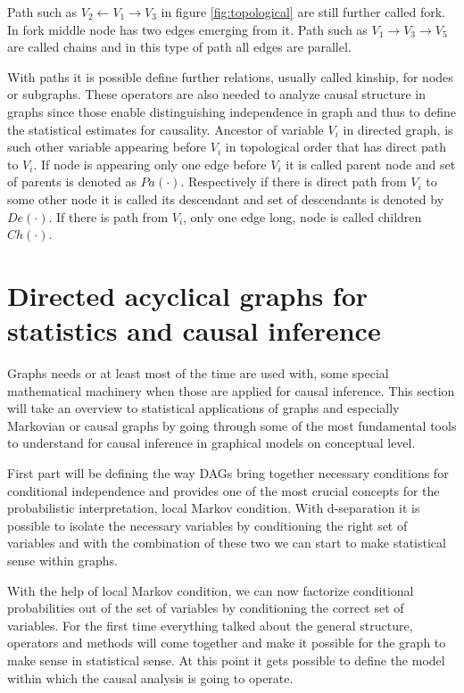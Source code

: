 \documentclass[main=english,12pt,a4paper,pdftex,econ,utf8]{aaltothesis}
\newcommand{\ch}[1]{Ch(#1)}
\newcommand{\pa}[1]{Pa(#1)}
\newcommand{\de}[1]{De(#1)}
\begin{document}
Path such as $V_{2}\leftarrow V_{1}\rightarrow V_{3}$ in figure \ref{fig:topological} are still further called fork. In fork middle node has two edges emerging from it. Path such as $V_{1}\rightarrow V_{3}\rightarrow V_{5}$ are called chains and in this type of path all edges are parallel.

With paths it is possible define further relations, usually called kinship, for nodes or subgraphs. These operators are also needed to analyze causal structure in graphs since those enable distinguishing independence in graph and thus to define the statistical estimates for causality. Ancestor of variable $V_{i}$ in directed graph, is such other variable appearing before $V_{i}$ in topological order that has direct path to $V_{i}$. If node is appearing only one edge before $V_{i}$ it is called parent node and set of parents is denoted as $\pa{\bm{\cdot}}$. Respectively if there is direct path from $V_{i}$ to some other node it is called its descendant and set of descendants is denoted by $\de{\bm{\cdot}}$. If there is path from $V_{i}$, only one edge long, node is called children $\ch{\bm{\cdot}}$.

\clearpage

\section{Directed acyclical graphs for statistics and causal inference} \label{section:stats and ci}

Graphs needs or at least most of the time are used with, some special mathematical machinery when those are applied for causal inference. This section will take an overview to statistical applications of graphs and especially Markovian or causal graphs by going through some of the most fundamental tools to understand for causal inference in graphical models on conceptual level.

First part will be defining the way DAGs bring together necessary conditions for conditional independence and provides one of the most crucial concepts for the probabilistic interpretation, local Markov condition. With d-separation it is possible to isolate the necessary variables by conditioning the right set of variables and with the combination of these two we can start to make statistical sense within graphs.

With the help of local Markov condition, we can now factorize conditional probabilities out of the set of variables by conditioning the correct set of variables. For the first time everything talked about the general structure, operators and methods will come together and make it possible for the graph to make sense in statistical sense. At this point it gets possible to define the model within which the causal analysis is going to operate.
\end{document}
